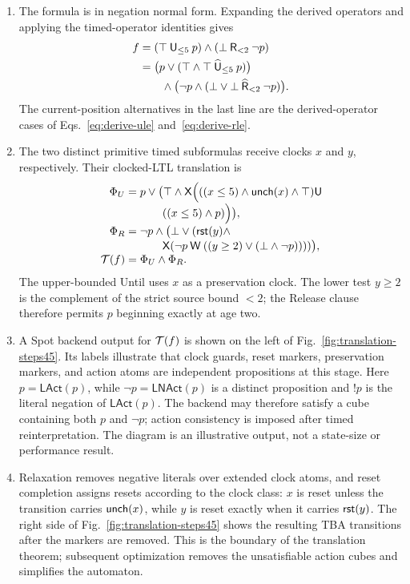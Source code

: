 \begin{enumerate}[label=Step~\arabic*:,leftmargin=*]
\item The formula is in negation normal form. Expanding the derived operators
and applying the timed-operator identities gives
\[
\begin{aligned}
f
 &= (\top\mathbin{\mathsf{U}}_{\le5}p)\land(\bot\mathbin{\mathsf{R}}_{<2}\neg p)\\
 &= \bigl(p\lor(\top\land\top\mathbin{\widehat{\mathsf{U}}}_{\le5}p)\bigr)\\
 &\qquad\land\bigl(\neg p\land(\bot\lor\bot\mathbin{\widehat{\mathsf{R}}}_{<2}\neg p)\bigr).
\end{aligned}
\]
The current-position alternatives in the last line are the derived-operator
cases of Eqs.~\eqref{eq:derive-ule} and~\eqref{eq:derive-rle}.

\item The two distinct primitive timed subformulas receive clocks $x$ and
$y$, respectively. Their clocked-LTL translation is
\begin{align*}
\Phi_U={}&p\lor\bigl(\top\land\mathsf{X}\Bigl(
  ((x\le5)\land\mathsf{unch}(x)\land\top)\mathbin{\mathsf{U}}\\[-1mm]
&\qquad((x\le5)\land p)\Bigr)\bigr),\\[-1mm]
\Phi_R={}&\neg p\land\bigl(\bot\lor(\mathsf{rst}(y)\land\\[-1mm]
&\qquad\mathsf{X}(\neg p\mathbin{\mathsf{W}}((y\ge2)\lor(\bot\land\neg p))))\bigr),\\[-1mm]
\mathcal{T}(f)={}&\Phi_U\land\Phi_R.
\end{align*}
The upper-bounded Until uses $x$ as a preservation clock. The lower test
$y\ge2$ is the complement of the strict source bound $<2$; the Release clause
therefore permits $p$ beginning exactly at age two.

\item A Spot backend output for $\mathcal{T}(f)$ is shown on the left of
Fig.~\ref{fig:translation-steps45}. Its labels illustrate that clock
guards, reset markers, preservation markers, and action atoms are independent
propositions at this stage. Here $p=\mathsf{LAct}(p)$, while $\neg
p=\mathsf{LNAct}(p)$ is a distinct proposition and $!p$ is the literal
negation of $\mathsf{LAct}(p)$. The backend may therefore satisfy a cube
containing both $p$ and $\neg p$; action consistency is imposed after timed
reinterpretation. The diagram is an illustrative output, not a state-size or
performance result.

\item Relaxation removes negative literals over extended clock atoms, and
reset completion assigns resets according to the clock class: $x$ is reset
unless the transition carries $\mathsf{unch}(x)$, while $y$ is reset exactly when it
carries $\mathsf{rst}(y)$. The right side of Fig.~\ref{fig:translation-steps45}
shows the resulting TBA transitions after the markers are removed. This is
the boundary of the translation theorem; subsequent optimization removes
the unsatisfiable action cubes and simplifies the automaton.
\end{enumerate}

